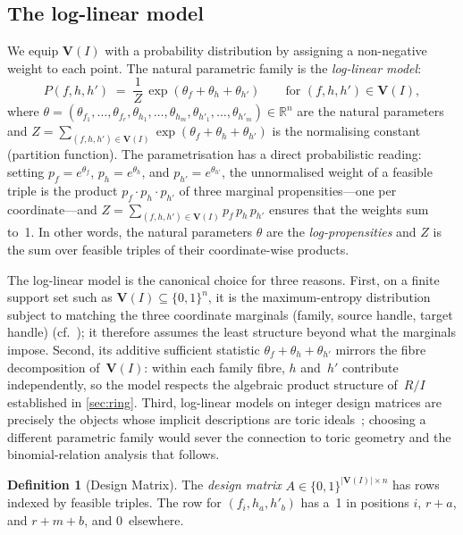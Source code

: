 \documentclass[preprint,12pt]{elsarticle}
\theoremstyle{definition}
\newtheorem{definition}[theorem]{Definition}
\theoremstyle{remark}
\newcommand{\RR}{\mathbb{R}}
\newcommand{\Var}{\mathbf{V}}
\begin{document}
\subsection{The log-linear model}

We equip $\Var(I)$ with a probability distribution by assigning
a non-negative weight to each point.  The natural parametric
family is the \emph{log-linear model}:
\[
  P(f, h, h') \;=\; \frac{1}{Z}\,
    \exp(\theta_f + \theta_h + \theta_{h'})
  \qquad\text{for } (f, h, h') \in \Var(I),
\]
where $\theta = (\theta_{f_1}, \ldots, \theta_{f_r},
\theta_{h_1}, \ldots, \theta_{h_m},
\theta_{h'_1}, \ldots, \theta_{h'_m}) \in \RR^n$
are the natural parameters and
$Z = \sum_{(f,h,h') \in \Var(I)} \exp(\theta_f + \theta_h + \theta_{h'})$
is the normalising constant (partition function).
The parametrisation has a direct probabilistic reading:
setting $p_f = e^{\theta_f}$, $p_h = e^{\theta_h}$, and
$p_{h'} = e^{\theta_{h'}}$, the unnormalised weight of a
feasible triple is the product $p_f \cdot p_h \cdot p_{h'}$
of three marginal propensities---one per coordinate---and
$Z = \sum_{(f,h,h') \in \Var(I)} p_f \, p_h \, p_{h'}$
ensures that the weights sum to~1.
In other words, the natural parameters $\theta$ are the
\emph{log-propensities} and $Z$ is the sum over feasible
triples of their coordinate-wise products.

The log-linear model is the canonical choice for three reasons.
First, on a finite support set such as $\Var(I) \subseteq \{0,1\}^n$,
it is the maximum-entropy distribution subject to matching the three
coordinate marginals (family, source handle, target handle)
(cf.~\cite{Csiszar75,WainwrightJordan08}); it therefore assumes
the least structure beyond what the marginals impose.  Second, its additive sufficient statistic
$\theta_f + \theta_h + \theta_{h'}$ mirrors the fibre decomposition
of~$\Var(I)$: within each family fibre, $h$ and~$h'$ contribute
independently, so the model respects the algebraic product structure
of~$R/I$ established in \cref{sec:ring}.  Third, log-linear models
on integer design matrices are precisely the objects whose
implicit descriptions are toric ideals~\cite{PS05,DSS09}; choosing a
different parametric family would sever the connection to toric
geometry and the binomial-relation analysis that follows.

\begin{definition}[Design Matrix]\label{def:design}
The \emph{design matrix} $A \in \{0,1\}^{|\Var(I)| \times n}$
has rows indexed by feasible triples.  The row for $(f_i, h_a, h'_b)$
has a~1 in positions $i$, $r + a$, and $r + m + b$, and 0~elsewhere.
\end{definition}
\end{document}
